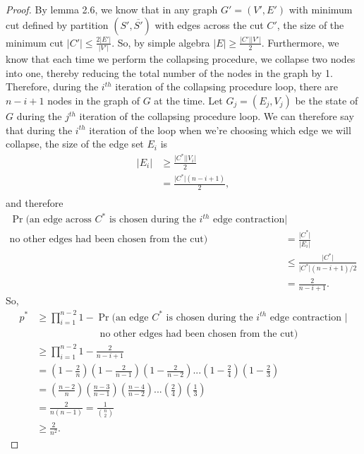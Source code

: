 \documentclass[psamsfonts, 10pt]{amsart}
\theoremstyle{definition}
\theoremstyle{remark}
\numberwithin{equation}{section}
\begin{document}
\begin{proof}
By lemma 2.6, we know that in any graph $G' = (V', E')$ with minimum cut defined by partition $(S', \overline{S'})$ with edges across the cut $C'$, the size of the minimum cut $\lvert C' \rvert \leq \frac{2\lvert E'\rvert}{\lvert V' \rvert}$. So, by simple algebra $\lvert E \rvert \geq \frac{\lvert C' \rvert \lvert V' \rvert}{2}$. Furthermore, we know that each time we perform the collapsing procedure, we collapse two nodes into one, thereby reducing the total number of the nodes in the graph by 1. Therefore, during the $i^{th}$ iteration of the collapsing procedure loop, there are $n-i + 1$ nodes in the graph of $G$ at the time. Let $G_j = (E_j, V_j)$ be the state of $G$ during the $j^{th}$ iteration of the collapsing procedure loop. We can therefore say that during the $i^{th}$ iteration of the loop when we're choosing which edge we will collapse, the size of the edge set $E_i$ is
\begin{equation*}
\begin{aligned}
\lvert E_i \rvert &\geq \frac{\lvert C^* \rvert \lvert V_i \rvert}{2}\\
&= \frac{\lvert C^* \rvert (n-i+1)}{2},\\
\end{aligned}
\end{equation*}
and therefore
\begin{equation}
\begin{aligned}
\Pr(\text{an edge across } C^* \text{ is chosen  during the }i^{th} \text{ edge contraction} \lvert\\
\text{no other edges had been chosen from the cut}) &=  \frac{\lvert C^* \rvert}{\lvert E_i \rvert}\\
&\leq \frac{\lvert C^* \rvert}{\lvert C^* \rvert(n-i + 1)/2}\\
&= \frac{2}{n-i + 1}.
\end{aligned}
\end{equation}
So, 
\begin{equation}
\begin{aligned}
p^* &\geq \prod_{i=1}^{n-2} 1 - \Pr(\text{an edge } C^* \text{ is chosen  during the }i^{th} \text{ edge contraction } \lvert\\
&\quad\quad\quad\quad\quad\quad \ \ \text{no other edges had been chosen from the cut})\\
&\geq \prod_{i = 1}^{n-2} 1- \frac{2}{n-i+1}\\
&= \left(1-\frac{2}{n}\right)\left(1-\frac{2}{n-1}\right)\left(1 - \frac{2}{n-2}\right)...\left(1-\frac{2}{4}\right)\left(1-\frac{2}{3}\right)\\
&= \left(\frac{n-2}{n}\right)\left(\frac{n-3}{n-1}\right)\left(\frac{n-4}{n-2}\right)...\left(\frac{2}{4}\right)\left(\frac{1}{3}\right)\\
&= \frac{2}{n(n-1)} = \frac{1}{\binom{n}{2}}\\
&\geq \frac{2}{n^2}.
\end{aligned}
\end{equation}
\end{proof}
\end{document}
